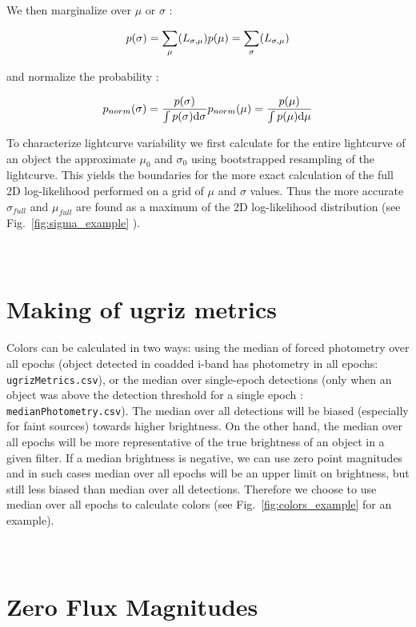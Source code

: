 \documentclass[fleqn,usenatbib]{mnras}  %
\begin{document}
We then marginalize over $\mu$ or $\sigma$ : 

\begin{equation}
p(\sigma) = \sum_{\mu}(L_{\sigma,\mu}) \\
p(\mu) = \sum_{\sigma}(L_{\sigma,\mu})
\end{equation}

and normalize the probability :

\begin{equation}
p_{norm}(\sigma) = \frac{p(\sigma)}{ \int {p(\sigma) \text{d}\sigma}} \\ 
p_{norm}(\mu) = \frac{p(\mu)} {\int {p(\mu) \text{d}\mu} }
\end{equation}


To characterize  lightcurve variability we first calculate for the entire lightcurve of an object  the approximate $\mu_{0}$ and $\sigma_{0}$ using bootstrapped resampling of the lightcurve.  This yields the boundaries for the more exact calculation of the full 2D log-likelihood performed on a grid of $\mu$ and $\sigma$ values. Thus the more accurate $\sigma_{full}$ and $\mu_{full}$ are found as a maximum of the 2D log-likelihood distribution (see Fig.~\ref{fig:sigma_example} ).


\section{\\ Making of ugriz metrics }
\label{App:AppendixC}

Colors can be calculated in two ways: using the median of forced photometry over all epochs (object detected in coadded i-band has photometry in all epochs:  \verb|ugrizMetrics.csv|), or the median over single-epoch detections (only when an object was above the detection threshold for a single epoch : \verb|medianPhotometry.csv|).  
The median over all detections will be biased (especially for faint sources) towards higher brightness.  On the other hand, the median over all epochs will be more representative of the true brightness of an object in a given filter.  If a median brightness is negative, we can use zero point magnitudes and in such cases median over all epochs will be an upper limit on brightness, but still less biased than median over all detections. Therefore  we choose to use median over all epochs to calculate colors (see Fig.~\ref{fig:colors_example} for an example).  

\section{\\ Zero Flux Magnitudes }
\label{App:AppendixD}
\end{document}
